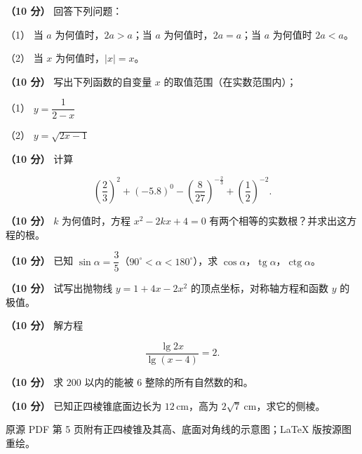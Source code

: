 \begin{question}
\textbf{（10 分）} 回答下列问题：

（1） 当 $a$ 为何值时，$2a>a$；当 $a$ 为何值时，$2a=a$；当 $a$ 为何值时 $2a<a$。

（2） 当 $x$ 为何值时，$|x|=x$。

\end{question}
\begin{question}
\textbf{（10 分）} 写出下列函数的自变量 $x$ 的取值范围（在实数范围内）；

（1） $y=\dfrac{1}{2-x}$

（2） $y=\sqrt{2x-1}$

\end{question}
\begin{question}
\textbf{（10 分）} 计算

\nopagebreak[4]
\[
\left(\frac{2}{3}\right)^{2}+(-5.8)^{0}-\left(\frac{8}{27}\right)^{-\frac{2}{3}}+\left(\frac{1}{2}\right)^{-2}.
\]

\end{question}
\begin{question}
\textbf{（10 分）} $k$ 为何值时，方程 $x^{2}-2kx+4=0$ 有两个相等的实数根？并求出这方程的根。

\end{question}
\begin{question}
\textbf{（10 分）} 已知 $\sin\alpha=\dfrac{3}{5}$（$90^\circ<\alpha<180^\circ$），求 $\cos\alpha$，$\operatorname{tg}\alpha$，$\operatorname{ctg}\alpha$。

\end{question}
\begin{question}
\textbf{（10 分）} 试写出抛物线 $y=1+4x-2x^{2}$ 的顶点坐标，对称轴方程和函数 $y$ 的极值。

\end{question}
\begin{question}
\textbf{（10 分）} 解方程

\nopagebreak[4]
\[
\frac{\lg 2x}{\lg (x-4)}=2.
\]

\end{question}
\begin{question}
\textbf{（10 分）} 求 $200$ 以内的能被 $6$ 整除的所有自然数的和。

\Needspace{0.4\textheight}
\end{question}
\begin{question}
\textbf{（10 分）} 已知正四棱锥底面边长为 $12\,\mathrm{cm}$，高为 $2\sqrt{7}\ \mathrm{cm}$，求它的侧棱。

\begin{gktip}
原源 PDF 第 5 页附有正四棱锥及其高、底面对角线的示意图；LaTeX 版按源图重绘。
\end{gktip}
\nopagebreak[4]
\begin{center}\end{center}
\nopagebreak[4]
\Needspace{0.4\textheight}
\end{question}
